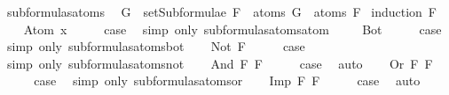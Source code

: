 \begin{isabellebody}
\ subformulas{\isacharunderscore}atoms{\isacharcolon}\isanewline
\ \ {\isachardoublequoteopen}G\ {\isasymin}\ setSubformulae\ F\ {\isasymLongrightarrow}\ atoms\ G\ {\isasymsubseteq}\ atoms\ F{\isachardoublequoteclose}\isanewline
%
\isadelimproof
%
\endisadelimproof
%
\isatagproof
{}\isamarkupfalse%
\ {\isacharparenleft}induction\ F{\isacharparenright}\isanewline
\ \ \isamarkupfalse%
\ {\isacharparenleft}Atom\ x{\isacharparenright}\isanewline
\ \ \isamarkupfalse%
\ \isamarkupfalse%
\ {\isacharquery}case\ \isamarkupfalse%
\ {\isacharparenleft}simp\ only{\isacharcolon}\ subformulas{\isacharunderscore}atoms{\isacharunderscore}atom{\isacharparenright}\ \isanewline
{}\isamarkupfalse%
\isanewline
\ \ \isamarkupfalse%
\ Bot\isanewline
\ \ \isamarkupfalse%
\ \isamarkupfalse%
\ {\isacharquery}case\ \isamarkupfalse%
\ {\isacharparenleft}simp\ only{\isacharcolon}\ subformulas{\isacharunderscore}atoms{\isacharunderscore}bot{\isacharparenright}\isanewline
{}\isamarkupfalse%
\isanewline
\ \ \isamarkupfalse%
\ {\isacharparenleft}Not\ F{\isacharparenright}\isanewline
\ \ \isamarkupfalse%
\ \isamarkupfalse%
\ {\isacharquery}case\ \isamarkupfalse%
\ {\isacharparenleft}simp\ only{\isacharcolon}\ subformulas{\isacharunderscore}atoms{\isacharunderscore}not{\isacharparenright}\isanewline
{}\isamarkupfalse%
\isanewline
\ \ \isamarkupfalse%
\ {\isacharparenleft}And\ F{}\ F{}{\isacharparenright}\isanewline
\ \ \isamarkupfalse%
\ \isamarkupfalse%
\ {\isacharquery}case\ \isamarkupfalse%
\ auto\isanewline
{}\isamarkupfalse%
\isanewline
\ \ \isamarkupfalse%
\ {\isacharparenleft}Or\ F{}\ F{}{\isacharparenright}\isanewline
\ \ \isamarkupfalse%
\ \isamarkupfalse%
\ {\isacharquery}case\ \isamarkupfalse%
\ {\isacharparenleft}simp\ only{\isacharcolon}\ subformulas{\isacharunderscore}atoms{\isacharunderscore}or{\isacharparenright}\isanewline
{}\isamarkupfalse%
\isanewline
\ \ \isamarkupfalse%
\ {\isacharparenleft}Imp\ F{}\ F{}{\isacharparenright}\isanewline
\ \ \isamarkupfalse%
\ \isamarkupfalse%
\ {\isacharquery}case\ \isamarkupfalse%
\ auto\isanewline

\end{isabellebody}
